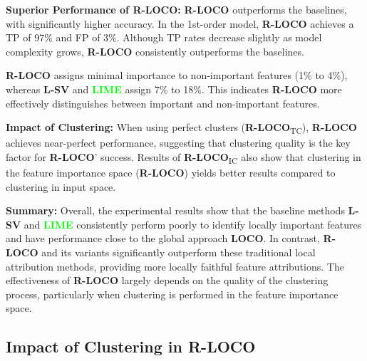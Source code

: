 \documentclass{article}
\theoremstyle{plain}
\theoremstyle{definition}
\theoremstyle{remark}
\newcommand{\ours}{\textcolor{ours}{\textbf{R-LOCO}}}
\newcommand{\loco}{\textcolor{loco}{\textbf{LOCO}}}
\newcommand{\ourstrue}{\textcolor{ours}{\textbf{R-LOCO}}\textsubscript{TC}}
\newcommand{\oursinput}{\textcolor{ours}{\textbf{R-LOCO}}\textsubscript{IC}}
\newcommand{\lsv}{\textcolor{lsv}{\textbf{L-SV}}}
\newcommand{\lime}{\textcolor{lime}{\textbf{LIME}}}
\begin{document}
\textbf{Superior Performance of \ours{}:}
\ours{} outperforms the baselines, with significantly higher accuracy. In the 1st-order model, \ours{} achieves a TP of 97\% and FP of 3\%. Although TP rates decrease slightly as model complexity grows, \ours{} consistently outperforms the baselines. 

\ours{} assigns minimal importance to non-important features (1\% to 4\%), whereas \lsv{} and \lime{} assign 7\% to 18\%. This indicates \ours{} more effectively distinguishes between important and non-important features.




\textbf{Impact of Clustering:}
When using perfect clusters (\ourstrue{}), \ours{} achieves near-perfect performance, suggesting that clustering quality is the key factor for \ours{}' success. Results of \oursinput{} also show that clustering in the feature importance space (\ours{}) yields better results compared to clustering in input space.

\textbf{Summary:}
Overall, the experimental results show that the baseline methods \lsv{} and \lime{} consistently perform poorly to identify locally important features and have performance close to the global approach \loco{}. In contrast, \ours{} and its variants significantly outperform these traditional local attribution methods, providing more locally faithful feature attributions. The effectiveness of \ours{} largely depends on the quality of the clustering process, particularly when clustering is performed in the feature importance space.

\subsection{Impact of Clustering in \ours{}} \label{impact:clustering}
\end{document}
